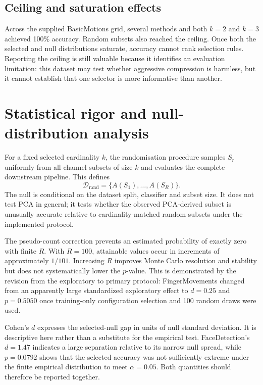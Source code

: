 \subsection{Ceiling and saturation effects}
Across the supplied BasicMotions grid, several methods and both $k=2$ and $k=3$ achieved 100\% accuracy. Random subsets also reached the ceiling. Once both the selected and null distributions saturate, accuracy cannot rank selection rules. Reporting the ceiling is still valuable because it identifies an evaluation limitation: this dataset may test whether aggressive compression is harmless, but it cannot establish that one selector is more informative than another.

\section{Statistical rigor and null-distribution analysis}
For a fixed selected cardinality $k$, the randomisation procedure samples $S_r$ uniformly from all channel subsets of size $k$ and evaluates the complete downstream pipeline. This defines
\begin{equation}
 \mathcal{D}_{\mathrm{rand}}=\{A(S_1),\ldots,A(S_R)\}.
\end{equation}
The null is conditional on the dataset split, classifier and subset size. It does not test PCA in general; it tests whether the observed PCA-derived subset is unusually accurate relative to cardinality-matched random subsets under the implemented protocol.

The pseudo-count correction prevents an estimated probability of exactly zero with finite $R$. With $R=100$, attainable values occur in increments of approximately $1/101$. Increasing $R$ improves Monte Carlo resolution and stability but does not systematically lower the $p$-value. This is demonstrated by the revision from the exploratory to primary protocol: FingerMovements changed from an apparently large standardized exploratory effect to $d=0.25$ and $p=0.5050$ once training-only configuration selection and 100 random draws were used.

Cohen's $d$ expresses the selected-null gap in units of null standard deviation. It is descriptive here rather than a substitute for the empirical test. FaceDetection's $d=1.47$ indicates a large separation relative to its narrow null spread, while $p=0.0792$ shows that the selected accuracy was not sufficiently extreme under the finite empirical distribution to meet $\alpha=0.05$. Both quantities should therefore be reported together.

